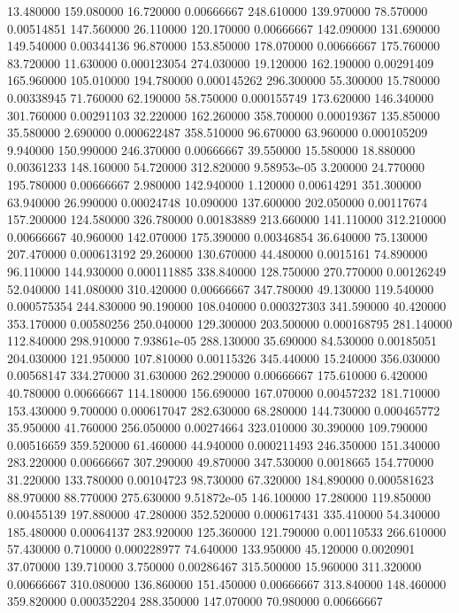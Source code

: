 13.480000	159.080000	16.720000	0.00666667
248.610000	139.970000	78.570000	0.00514851
147.560000	26.110000	120.170000	0.00666667
142.090000	131.690000	149.540000	0.00344136
96.870000	153.850000	178.070000	0.00666667
175.760000	83.720000	11.630000	0.000123054
274.030000	19.120000	162.190000	0.00291409
165.960000	105.010000	194.780000	0.000145262
296.300000	55.300000	15.780000	0.00338945
71.760000	62.190000	58.750000	0.000155749
173.620000	146.340000	301.760000	0.00291103
32.220000	162.260000	358.700000	0.00019367
135.850000	35.580000	2.690000	0.000622487
358.510000	96.670000	63.960000	0.000105209
9.940000	150.990000	246.370000	0.00666667
39.550000	15.580000	18.880000	0.00361233
148.160000	54.720000	312.820000	9.58953e-05
3.200000	24.770000	195.780000	0.00666667
2.980000	142.940000	1.120000	0.00614291
351.300000	63.940000	26.990000	0.00024748
10.090000	137.600000	202.050000	0.00117674
157.200000	124.580000	326.780000	0.00183889
213.660000	141.110000	312.210000	0.00666667
40.960000	142.070000	175.390000	0.00346854
36.640000	75.130000	207.470000	0.000613192
29.260000	130.670000	44.480000	0.0015161
74.890000	96.110000	144.930000	0.000111885
338.840000	128.750000	270.770000	0.00126249
52.040000	141.080000	310.420000	0.00666667
347.780000	49.130000	119.540000	0.000575354
244.830000	90.190000	108.040000	0.000327303
341.590000	40.420000	353.170000	0.00580256
250.040000	129.300000	203.500000	0.000168795
281.140000	112.840000	298.910000	7.93861e-05
288.130000	35.690000	84.530000	0.00185051
204.030000	121.950000	107.810000	0.00115326
345.440000	15.240000	356.030000	0.00568147
334.270000	31.630000	262.290000	0.00666667
175.610000	6.420000	40.780000	0.00666667
114.180000	156.690000	167.070000	0.00457232
181.710000	153.430000	9.700000	0.000617047
282.630000	68.280000	144.730000	0.000465772
35.950000	41.760000	256.050000	0.00274664
323.010000	30.390000	109.790000	0.00516659
359.520000	61.460000	44.940000	0.000211493
246.350000	151.340000	283.220000	0.00666667
307.290000	49.870000	347.530000	0.0018665
154.770000	31.220000	133.780000	0.00104723
98.730000	67.320000	184.890000	0.000581623
88.970000	88.770000	275.630000	9.51872e-05
146.100000	17.280000	119.850000	0.00455139
197.880000	47.280000	352.520000	0.000617431
335.410000	54.340000	185.480000	0.00064137
283.920000	125.360000	121.790000	0.00110533
266.610000	57.430000	0.710000	0.000228977
74.640000	133.950000	45.120000	0.0020901
37.070000	139.710000	3.750000	0.00286467
315.500000	15.960000	311.320000	0.00666667
310.080000	136.860000	151.450000	0.00666667
313.840000	148.460000	359.820000	0.000352204
288.350000	147.070000	70.980000	0.00666667
